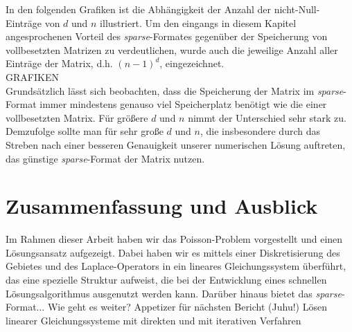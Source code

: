 \documentclass{scrartcl}
\begin{document}
In den folgenden Grafiken ist die Abhängigkeit der Anzahl der nicht-Null-Einträge von $d$ und $n$ illustriert. Um den eingangs in diesem Kapitel angesprochenen Vorteil des \textit{sparse}-Formates gegenüber der Speicherung von vollbesetzten Matrizen zu verdeutlichen, wurde auch die jeweilige Anzahl aller Einträge der Matrix, d.h. $(n-1)^d$, eingezeichnet.\\
GRAFIKEN\\
Grundsätzlich lässt sich beobachten, dass die Speicherung der Matrix im \textit{sparse}-Format immer mindestens genauso viel Speicherplatz benötigt wie die einer vollbesetzten Matrix. Für größere $d$ und $n$ nimmt der Unterschied sehr stark zu. Demzufolge sollte man für sehr große $d$ und $n$, die insbesondere durch das Streben nach einer besseren Genauigkeit unserer numerischen Lösung auftreten, das günstige \textit{sparse}-Format der Matrix nutzen.

\pagebreak
\section{Zusammenfassung und Ausblick}
Im Rahmen dieser Arbeit haben wir das Poisson-Problem vorgestellt und einen Lösungsansatz aufgezeigt. Dabei haben wir es mittels einer Diskretisierung des Gebietes und des Laplace-Operators in ein lineares Gleichungssystem überführt, das eine spezielle Struktur aufweist, die bei der Entwicklung eines schnellen Lösungsalgorithmus ausgenutzt werden kann. Darüber hinaus bietet das \textit{sparse}-Format...
Wie geht es weiter? Appetizer für nächsten Bericht (Juhu!)
Lösen linearer Gleichungssysteme mit direkten und mit iterativen Verfahren

\pagebreak
\nocite{*}


\end{document}
